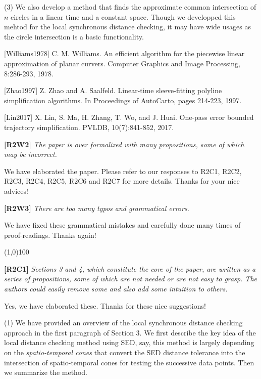 \documentclass{letter}
\begin{document}
(3) We also develop a method that finds the approximate common intersection of $n$ circles in a linear time and a constant space. Though we developped this mehtod for the local synchronous distance checking, it may have wide usages as the circle intersection is a basic functionality.

[Williams1978] C. M. Williams. An efficient algorithm for the piecewise linear approximation of planar curvers. Computer Graphics and Image Processing, 8:286-293, 1978.

[Zhao1997]  Z. Zhao and A. Saalfeld. Linear-time sleeve-fitting polyline simplification algorithms. In Proceedings of AutoCarto, pages 214-223, 1997.

[Lin2017] X. Lin, S. Ma, H. Zhang, T. Wo, and J. Huai. One-pass error bounded trajectory simplification. PVLDB, 10(7):841-852, 2017.

\textbf{[R2W2]} \emph{The paper is over formalized with many propositions, some of which may be incorrect.}

We have elaborated the paper. Please refer to our responses to R2C1, R2C2, R2C3, R2C4, R2C5, R2C6 and R2C7 for more details. Thanks for your nice advices!

\textbf{[R2W3]} \emph{There are too many typos and grammatical errors.}

We have fixed these grammatical mistakes and carefully done many times of proof-readings. Thanks again!

\line(1,0){100}

\textbf{[R2C1]} \emph{Sections 3 and 4, which constitute the core of the paper, are written as a series of propositions, some of which are not needed or are not easy to grasp. The authors could easily remove some and also add some intuition to others.}

Yes, we have elaborated these. Thanks for these nice suggestions!

(1) We have provided an overview of the local synchronous distance checking approach in the first paragraph of Section 3. We first describe the key idea of the local distance checking method using SED, say, this method is largely depending on the \emph{spatio-temporal cones} that convert the SED distance tolerance into the intersection of spatio-temporal cones for testing the successive data points. Then we summarize the method. 
\end{document}
